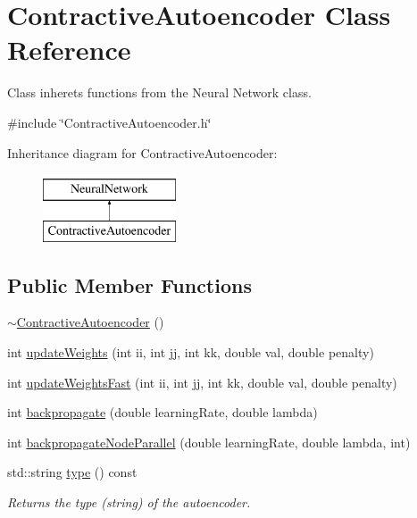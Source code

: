 \hypertarget{classContractiveAutoencoder}{}\section{Contractive\+Autoencoder Class Reference}
\label{classContractiveAutoencoder}


Class inherets functions from the Neural Network class.  




{\ttfamily \#include \char`\"{}Contractive\+Autoencoder.\+h\char`\"{}}

Inheritance diagram for Contractive\+Autoencoder\+:\begin{figure}[H]
\begin{center}
\leavevmode
\includegraphics[height=2.000000cm]{classContractiveAutoencoder}
\end{center}
\end{figure}
\subsection*{Public Member Functions}
\begin{DoxyCompactItemize}
\item 
\hyperlink{classContractiveAutoencoder_a0817944843aa751ae7391d36d9f7a717}{$\sim$\+Contractive\+Autoencoder} ()
\item 
int \hyperlink{classContractiveAutoencoder_ab10b3558c21939bed2654a0110b6bc08}{update\+Weights} (int ii, int jj, int kk, double val, double penalty)
\item 
int \hyperlink{classContractiveAutoencoder_a66faa7d13437de0e864a6adec9994cd8}{update\+Weights\+Fast} (int ii, int jj, int kk, double val, double penalty)
\item 
int \hyperlink{classContractiveAutoencoder_a66bf959d85d09b2f5cc2e06d6bdfe6bf}{backpropagate} (double learning\+Rate, double lambda)
\item 
int \hyperlink{classContractiveAutoencoder_a65daf5136737423ee6b0fd89442cbf70}{backpropagate\+Node\+Parallel} (double learning\+Rate, double lambda, int)
\item 
std\+::string \hyperlink{classContractiveAutoencoder_a8db3fc9434f66e1a7e036a49f2d19ac6}{type} () const 
\begin{DoxyCompactList}\small\item\em Returns the type (string) of the autoencoder. \end{DoxyCompactList}\end{DoxyCompactItemize}

